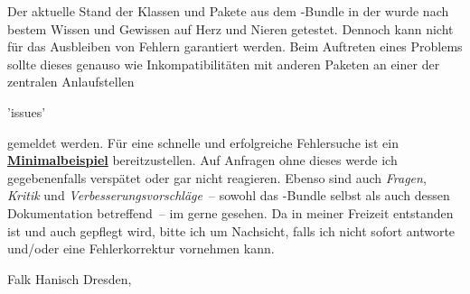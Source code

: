 Der aktuelle Stand der Klassen und Pakete aus dem \TUDScript-Bundle in der 
 wurde nach bestem Wissen und Gewissen auf Herz und Nieren 
getestet. Dennoch kann nicht für das Ausbleiben von Fehlern garantiert werden. 
Beim Auftreten eines Problems sollte dieses genauso wie Inkompatibilitäten mit 
anderen Paketen an einer der zentralen Anlaufstellen
\begin{quoting}
\renewcommand*\href[2]{\url{#1}\quad(#2)}
\GitHubRepo'issues'\newline\Forum%
\end{quoting}
gemeldet werden. Für eine schnelle und erfolgreiche Fehlersuche ist ein 
\href{http://www.komascript.de/minimalbeispiel}{\textbf{Minimalbeispiel}} 
bereitzustellen. Auf Anfragen ohne dieses werde ich gegebenenfalls verspätet 
oder gar nicht reagieren. Ebenso sind auch \emph{Fragen}, \emph{Kritik} und 
\emph{Verbesserungsvorschläge}~-- sowohl das \TUDScript-Bundle selbst als auch 
dessen Dokumentation betreffend~-- im \TUDForum gerne gesehen. Da \TUDScript in 
meiner Freizeit entstanden ist und auch gepflegt wird, bitte ich um Nachsicht, 
falls ich nicht sofort antworte und/oder eine Fehlerkorrektur vornehmen kann.

\bigskip\bigskip
\noindent Falk Hanisch\newline
Dresden, 
